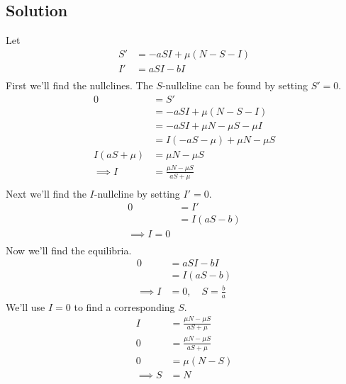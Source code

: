 \documentclass[12pt]{article}
\begin{document}
\subsection*{Solution}
Let
\begin{equation*}
  \begin{aligned}
    S' &= -aSI+\mu(N-S-I) \\
    I' &= aSI-bI \\
  \end{aligned}
\end{equation*}
First we'll find the nullclines. The $S$-nullcline can be found by setting $S'=0$.
\begin{equation*}
  \begin{aligned}
    0 &= S' \\
    &= -aSI+\mu(N-S-I) \\
    &= -aSI+\mu N- \mu S-\mu I \\
    &= I(-aS-\mu) + \mu N - \mu S \\
    I(aS+\mu) &= \mu N - \mu S \\
    \implies I &= \frac{\mu N - \mu S}{aS+\mu} \\
  \end{aligned}
\end{equation*}
Next we'll find the $I$-nullcline by setting $I'=0$.
\begin{equation*}
  \begin{aligned}
    0 &= I' \\
    &= I(aS-b) \\
    \implies I = 0 \\
  \end{aligned}
\end{equation*}
Now we'll find the equilibria.
\begin{equation*}
  \begin{aligned}
    0 &= aSI-bI \\
    &= I(aS-b) \\
    \implies I&=0, \quad S=\frac{b}{a}
  \end{aligned}
\end{equation*}
We'll use $I=0$ to find a corresponding $S$.
\begin{equation*}
  \begin{aligned}
    I &= \frac{\mu N - \mu S}{aS+\mu} \\
    0 &= \frac{\mu N - \mu S}{aS+\mu} \\
    0 &= \mu (N - S) \\
    \implies S &= N \\
  \end{aligned}
\end{equation*}
\end{document}
